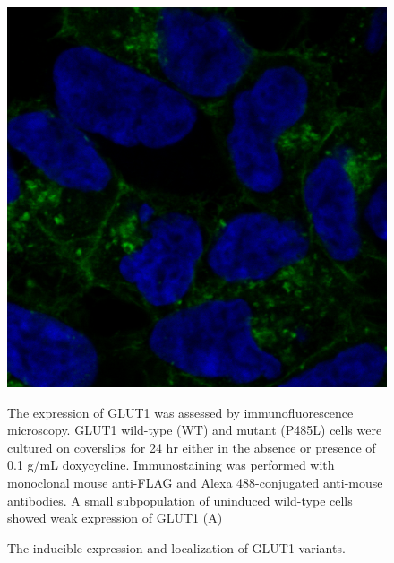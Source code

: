 \begin{figure}[h]
\centering
\includegraphics[scale=0.2]{Figures/induction_IF}
\caption{The inducible expression and localization of GLUT1 variants.}
\vspace*{-3mm}
\small \justify
The expression of GLUT1 was assessed by immunofluorescence microscopy. GLUT1 wild-type (WT) and mutant (P485L) cells were cultured on coverslips for 24 hr either in the absence or presence of 0.1 {}\textmu g/mL doxycycline. Immunostaining was performed with monoclonal mouse anti-FLAG and Alexa 488-conjugated anti-mouse antibodies. A small subpopulation of uninduced wild-type cells showed weak expression of GLUT1 (A)
\label{fig:IF}
\end{figure}

